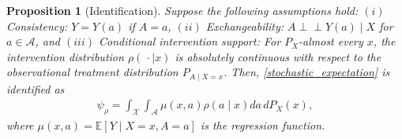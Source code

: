 \documentclass[11pt,twoside]{article}
\newcommand{\ind}{\perp\!\!\!\!\perp}
\def\ind{\perp\!\!\!\perp}
\newtheorem{proposition}{Proposition}
\theoremstyle{definition}
\theoremstyle{remark}
\begin{document}
\begin{proposition}[Identification] \label{identification_proposition}
    Suppose the following assumptions hold: $(i)$ \textit{Consistency:} $Y = Y(a)$ if $A = a$, $(ii)$ \textit{Exchangeability:} $A \ind Y(a) \mid X$ for $a \in \mathcal{A}$, and $(iii)$ \textit{Conditional intervention support:} For $P_X$-almost every $x$, the intervention distribution $\rho(\,\cdot\mid x)$ is absolutely continuous with respect to the observational treatment distribution $P_{A\mid X=x}$. Then, \cref{stochastic_expectation} is identified as
\begin{align*}
    \psi_\rho =  \int_{\mathcal{X}} \int_{\mathcal{A}}  \mu(x, a) \rho(a \! \mid \! x) da \,  dP_X(x),
\end{align*}
where $\mu(x, a) = \mathbb{E}[Y \mid X = x, A = a]$ is the regression function.
\end{proposition}
\end{document}
